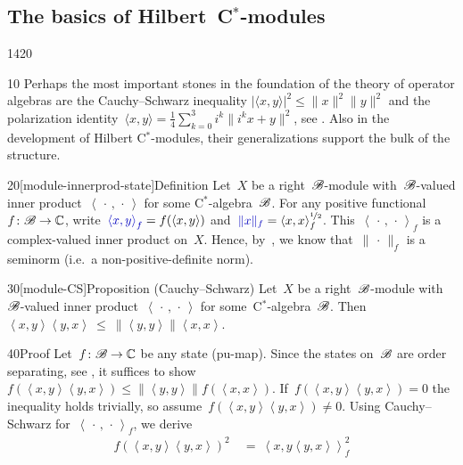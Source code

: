 \subsection{The basics of Hilbert~C$^*$-modules}
\begin{parsec}{1420}%
\begin{point}{10}%
    Perhaps the most important stones in the foundation
        of the theory of operator algebras
        are the Cauchy--Schwarz inequality
        $| \langle x,y\rangle|^2 \leq \|x\|^2\|y\|^2$
        and the polarization
        identity~$\langle x,y\rangle = \frac{1}{4} \sum_{k=0}^3 i^k \|i^k x+ y\|^2$,
        see .
    Also in the development of Hilbert C$^*$-modules,
        their generalizations support the bulk of the structure.
\end{point}
\begin{point}{20}[module-innerprod-state]{Definition}%
Let~$X$ be a right~$\mathscr{B}$-module with~$\mathscr{B}$-valued inner
    product~$\left<\,\cdot\,,\,\cdot\,\right>$ for some
    C$^*$-algebra~$\mathscr{B}$.
For any positive functional~$f\colon \mathscr{B} \to \mathbb{C}$,
write~$\Define{\left<x,y\right>_f} = f(\left<x,y\right>)$
and~$\Define{\|x\|_f} = \smash{ \langle x,x\rangle^{\nicefrac{1}{2}}_f}$.
This~$\left<\,\cdot\,,\,\cdot\,\right>_f$
    is a complex-valued inner product on~$X$.
Hence, by~,
    we know that~$\|\,\cdot\,\|_f$ is a seminorm
        (i.e.~a non-positive-definite norm).
\end{point}
\begin{point}{30}[module-CS]{Proposition (Cauchy--Schwarz)}%
Let~$X$ be a right~$\mathscr{B}$-module
    with~$\mathscr{B}$-valued inner product~$\left<\,\cdot\,,\,\cdot\,\right>$
    for some~C$^*$-algebra~$\mathscr{B}$.
Then~$\left<x,y\right>\left<y,x\right> \ \leq\  \|\left<y,y\right>\| \left<x,x\right>$.
\begin{point}{40}{Proof}%
Let~$f\colon \mathscr{B} \to \mathbb{C}$ be any state (pu-map).
Since the states on~$\mathscr{B}$ are order separating,
see ,
it suffices to show~$f(\left<x,y\right>\left<y,x\right>)
\leq \|\left<y,y\right>\| f(\left<x,x\right>)$.
If~$f(\left<x,y\right>\left<y,x\right>) = 0$
the inequality holds trivially,
so assume~$f(\left<x,y\right>\left<y,x\right>) \neq 0$.
Using Cauchy--Schwarz for~$\left<\,\cdot\,,\,\cdot\,\right>_f$,
    we derive
\begin{align*}
    f(\left<x,y\right>\left<y,x\right>)^2
        &\  =\  \left<x,y\left<y,x\right>\right>_f^2 \\

\end{align*}
\end{point}
\end{point}
\end{parsec}
